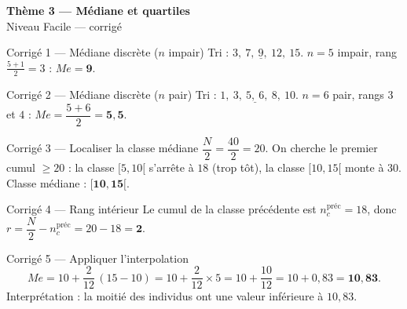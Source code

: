 \documentclass[11pt,a4paper]{article}
\newcommand{\bandeau}[2]{%
\begin{tcolorbox}[boxbase,colback=primary,colframe=primarydark,halign=center,
   before skip=2pt,after skip=12pt]
{\LARGE\bfseries\color{white} #1}\\[3pt]{\normalsize\color{white} #2}
\end{tcolorbox}}
\newcommand{\med}{M\!e}
\begin{document}
\bandeau{Thème 3 — Médiane et quartiles}{Niveau Facile — corrigé}

\begin{corbox}{Corrigé 1 — Médiane discrète ($n$ impair)}
Tri : $3,\ 7,\ \underline{9},\ 12,\ 15$. $n=5$ impair, rang $\tfrac{5+1}{2}=3$ : $\med=\mathbf{9}$.
\end{corbox}

\begin{corbox}{Corrigé 2 — Médiane discrète ($n$ pair)}
Tri : $1,\ 3,\ \underline{5,\ 6},\ 8,\ 10$. $n=6$ pair, rangs $3$ et $4$ :
$\med=\dfrac{5+6}{2}=\mathbf{5{,}5}$.
\end{corbox}

\begin{corbox}{Corrigé 3 — Localiser la classe médiane}
$\dfrac{N}{2}=\dfrac{40}{2}=20$. On cherche le premier cumul $\geqslant 20$ : la classe $[5,10[$
s'arrête à $18$ (trop tôt), la classe $[10,15[$ monte à $30$. Classe médiane : $\mathbf{[10,15[}$.
\end{corbox}

\begin{corbox}{Corrigé 4 — Rang intérieur}
Le cumul de la classe précédente est $n_c^{\text{préc}}=18$, donc
$r=\dfrac{N}{2}-n_c^{\text{préc}}=20-18=\mathbf{2}$.
\end{corbox}

\begin{corbox}{Corrigé 5 — Appliquer l'interpolation}
\[
\med=10+\frac{2}{12}\,(15-10)=10+\frac{2}{12}\times5=10+\frac{10}{12}=10+0{,}83=\mathbf{10{,}83}.
\]
Interprétation : la moitié des individus ont une valeur inférieure à $10{,}83$.
\end{corbox}
\end{document}
